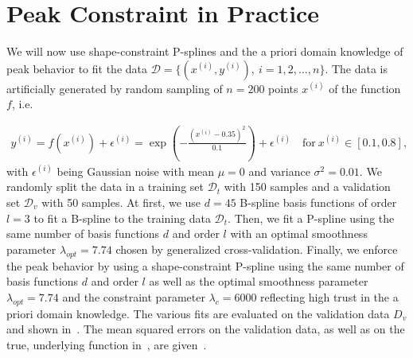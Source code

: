 \section{Peak Constraint in Practice} \label{sec:peak-behav-noisy}

We will now use shape-constraint P-splines and the a priori domain knowledge of peak behavior to fit the data $\mathcal{D} = \{(x^{(i)}, y^{(i)}), \ i=1,2,\dots,n\}$. The data is artificially generated by random sampling of $n=200$ points $x^{(i)}$ of the function $f$, i.e.

\begin{align} \label{eq:test-func-peak}
	y^{(i)} = f(x^{(i)}) + \epsilon^{(i)} = \exp\left(-\frac{(x^{(i)} - 0.35)^2}{0.1} \right) + \epsilon^{(i)} \quad \text{for} \ x^{(i)} \in [0.1,0.8],
\end{align}
%
with $\epsilon^{(i)}$ being Gaussian noise with mean $\mu = 0$ and variance $\sigma^2 = 0.01$. We randomly split the data in a training set $\mathcal{D}_t$ with 150 samples and a validation set $\mathcal{D}_v$ with 50 samples. At first, we use $d=45$ B-spline basis functions of order $l=3$ to fit a B-spline to the training data $\mathcal{D}_t$. Then, we fit a P-spline using the same number of basis functions $d$ and order $l$ with an optimal smoothness parameter $\lambda_{opt} = 7.74$ chosen by generalized cross-validation. Finally, we enforce the peak behavior by using a shape-constraint P-spline using the same number of basis functions $d$ and order $l$ as well as the optimal smoothness parameter $\lambda_{opt}=7.74$ and the constraint parameter $\lambda_c=6000$ reflecting high trust in the a priori domain knowledge. The various fits are evaluated on the validation data $D_v$ and shown in~. The mean squared errors on the validation data, as well as on the true, underlying function in~, are given~.


